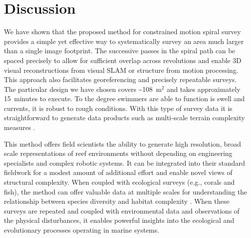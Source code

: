 \section{Discussion}
We have shown that the proposed method for constrained motion spiral survey provides a simple yet effective way to systematically survey an area much larger than a single image footprint. The successive passes in the spiral path can be spaced precisely to allow for sufficient overlap across revolutions and enable 3D visual reconstructions from visual SLAM or structure from motion processing. This approach also facilitates georeferencing and precisely repeatable surveys. The particular design we have chosen covers \sim108~m$^2$ and takes approximately 15~minutes to execute. To the degree swimmers are able to function is swell and currents, it is robust to rough conditions. With this type of survey data it is straightforward to generate data products such as multi-scale terrain complexity measures \cite{Friedman_2012}.

This method offers field scientists the ability to generate high resolution, broad scale representations of reef environments without depending on engineering specialists and complex robotic systems. It can be integrated into their standard fieldwork for a modest amount of additional effort and enable novel views of structural complexity. When coupled with ecological surveys (e.g., corals and fish), the method can offer valuable data at multiple scales for understanding the relationship between species diversity and habitat complexity  \cite{Graham_2012}. When these surveys are repeated and coupled with environmental data and observations of the physical disturbances, it enables powerful insights into the ecological and evolutionary processes operating in marine systems.

